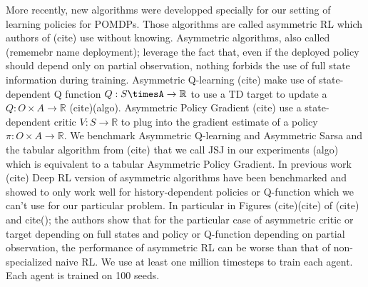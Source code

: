 More recently, new algorithms were developped specially for our setting of learning policies for POMDPs. Those algorithms are called asymmetric RL which authors of (cite) use without knowing. 
Asymmetric algorithms, also called (rememebr name deployment); leverage the fact that, even if the deployed policy should depend only on partial observation, nothing forbids the use of full state information during training.
Asymmetric Q-learning (cite) make use of state-dependent Q function $Q:S\timesA \rightarrow \mathbb{R}$ to use a TD target to update a $Q:O\times A\rightarrow \mathbb{R}$ (cite)(algo).    
Asymmetric Policy Gradient (cite) use a state-dependent critic $V:S\rightarrow \mathbb{R}$ to plug into the gradient estimate of a policy $\pi:O\times A \rightarrow \mathbb{R}$.
We benchmark Asymmetric Q-learning and Asymmetric Sarsa and the tabular algorithm from (cite) that we call JSJ in our experiments (algo) which is equivalent to a tabular Asymmetric Policy Gradient.
In previous work (cite) Deep RL version of asymmetric algorithms have been benchmarked and showed to only work well for history-dependent policies or Q-function which we can't use for our particular problem.
In particular in Figures (cite)(cite) of (cite) and cite(); the authors show that for the particular case of asymmetric critic or target depending on full states and policy or Q-function depending on partial observation, the performance of asymmetric RL can be worse than that of non-specialized naive RL.
We use at least one million timesteps to train each agent. Each agent is trained on 100 seeds.  

